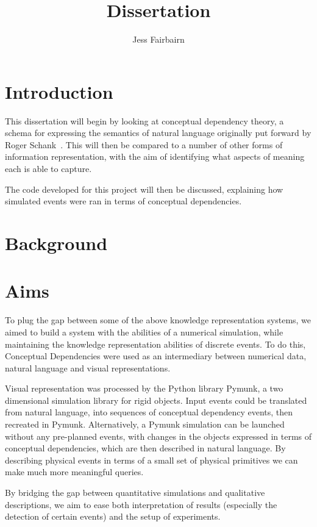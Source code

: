\documentclass{article}
\author{Jess Fairbairn}
\title{Dissertation}
\begin{document}
    \maketitle
    \tableofcontents
    \section{Introduction}
    This dissertation will begin by looking at conceptual dependency theory, a schema for expressing the semantics of natural language originally put forward by Roger Schank~\cite{SCHANK1972552}. This will then be compared to a number of other forms of information representation, with the aim of identifying what aspects of meaning each is able to capture.

    The code developed for this project will then be discussed, explaining how simulated events were ran in terms of conceptual dependencies. 

    \section{Background}
    

    \section{Aims}
    To plug the gap between some of the above knowledge representation systems, we aimed to build a system with the abilities of a numerical simulation, while maintaining the knowledge representation abilities of discrete events. To do this, Conceptual Dependencies were used as an intermediary between numerical data, natural language and visual representations.

    Visual representation was processed by the Python library Pymunk, a two dimensional simulation library for rigid objects. Input events could be translated from natural language, into sequences of conceptual dependency events, then recreated in Pymunk. Alternatively, a Pymunk simulation can be launched without any pre-planned events, with changes in the objects expressed in terms of conceptual dependencies, which are then described in natural language. By describing physical events in terms of a small set of physical primitives we can make much more meaningful queries.

    By bridging the gap between quantitative simulations and qualitative descriptions, we aim to ease both interpretation of results (especially the detection of certain events) and the setup of experiments.
\end{document}

